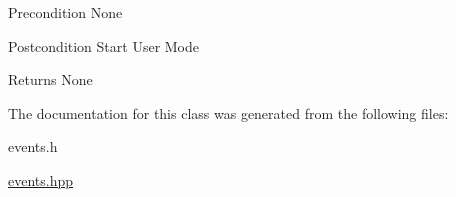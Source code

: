 \begin{DoxyPrecond}{Precondition}
None 
\end{DoxyPrecond}
\begin{DoxyPostcond}{Postcondition}
Start User Mode 
\end{DoxyPostcond}
\begin{DoxyReturn}{Returns}
None 
\end{DoxyReturn}


The documentation for this class was generated from the following files\+:\begin{DoxyCompactItemize}
\item 
events.\+h\item 
\mbox{\hyperlink{events_8hpp}{events.\+hpp}}\end{DoxyCompactItemize}
